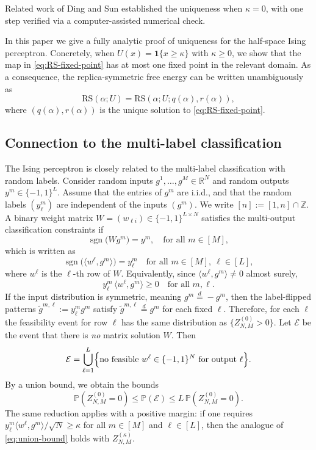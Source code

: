 \documentclass[11pt]{article}
\begin{document}
Related work of Ding and Sun \cite{DingSun2025} established the uniqueness when $\kappa=0$, with one step verified via a computer-assisted numerical check.

In this paper we give a fully analytic proof of uniqueness for the half-space Ising perceptron. Concretely, when $U(x)=\mathbf{1}\{x\ge \kappa\}$ with $\kappa\ge 0$, we show that the map in \eqref{eq:RS-fixed-point} has at most one fixed point in the relevant domain. As a consequence, the replica-symmetric free energy can be written unambiguously as
\[
\mathrm{RS}(\alpha;U)
=
\mathrm{RS}(\alpha;U;q(\alpha),r(\alpha)),
\]
where $(q(\alpha),r(\alpha))$ is the unique solution to \eqref{eq:RS-fixed-point}.

\subsection{Connection to the multi-label classification}

The Ising perceptron is closely related to the multi-label classification with random labels. 
Consider random inputs $g^1,\dots,g^M\in\mathbb R^N$ and random outputs $y^m\in\{-1,1\}^L$. Assume that the entries of $g^m$ are i.i.d., and that the random labels $(y^m_\ell)$  are independent of the inputs $(g^m)$. We write $[n]:=[1,n]\cap \mathbb Z$. 
A binary weight matrix $W=(w_{\ell i})\in\{-1,1\}^{L\times N}$ satisfies the multi-output classification constraints if
\[\operatorname{sgn}\bigl(W g^m\bigr)=y^m,\quad\text{for all } m\in[M],
\]
 which is written as
 \[
\operatorname{sgn}\bigl(\langle w^\ell,g^m\rangle\bigr)=y^m_\ell
\quad\text{for all } m\in[M],\ \ell\in[L],\]
where $w^\ell$ is the $\ell$-th row of $W$. Equivalently, since $\langle w^\ell,g^m\rangle\neq 0$ almost surely,
\[
y^m_\ell\,\langle w^\ell,g^m\rangle \ge 0
\quad\text{for all } m,\ell.
\]
If the input distribution is symmetric, meaning $g^m\stackrel d= -g^m$, then the label-flipped patterns
$\tilde g^{m,\ell}:=y^m_\ell g^m$ satisfy $\tilde g^{m,\ell}\stackrel d=g^m$ for each fixed $\ell$. Therefore, for each $\ell$ the feasibility event for row $\ell$ has the same distribution as $\{Z_{N,M}^{(0)}>0\}$.
Let $\mathcal E$ be the event that there is \emph{no} matrix solution $W$. Then
\[
\mathcal E=\bigcup_{\ell=1}^L\Bigl\{\text{no feasible } w^\ell \in\{-1,1\}^N \text{ for output }\ell\Bigr\}.
\]
By a union bound, we obtain the bounds
\begin{equation}\label{eq:union-bound}
\mathbb P(Z_{N,M}^{(0)}=0)
\le
\mathbb P(\mathcal E)
\le
L\,\mathbb P(Z_{N,M}^{(0)}=0).
\end{equation}
The same reduction applies with a positive margin: if one requires $y^m_\ell \langle w^\ell,g^m\rangle/\sqrt N\ge \kappa$ for all $m\in[M]$ and $\ell\in[L]$, then the analogue of \eqref{eq:union-bound} holds with $Z_{N,M}^{(\kappa)}$.
\end{document}
